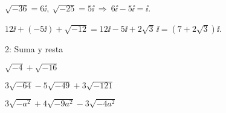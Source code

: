 
\begin{ejemplos}
  \item \(\sqrt{-36} = 6\ii,\ \sqrt{-25} = 5\ii \ \Rightarrow\ 6\ii - 5\ii = \ii\).
  \item \(12\ii + (-5\ii) + \sqrt{-12}
          = 12\ii - 5\ii + 2\sqrt{3}\,\ii
          = (7 + 2\sqrt{3})\ii\).
\end{ejemplos}

\begin{actividad}{2: Suma y resta}
  \item \(\sqrt{-4} + \sqrt{-16}\)
  \item \(3\sqrt{-64} - 5\sqrt{-49} + 3\sqrt{-121}\)
  \item \(3\sqrt{-a^2} + 4\sqrt{-9a^2} - 3\sqrt{-4a^2}\)
\end{actividad}